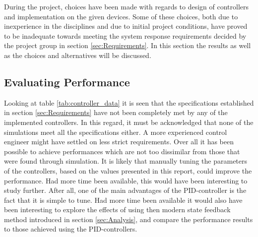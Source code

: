 \documentclass[../../main.tex]{subfiles}
\begin{document}

During the project, choices have been made with regards to design of controllers and implementation on the given devices. Some of these choices, both due to inexperience in the disciplines and due to initial project conditions, have proved to be inadequate towards meeting the system response requirements decided by the project group in section \ref{sec:Requirements}. In this section the results as well as the choices and alternatives will be discussed.

\subsection{Evaluating Performance}

Looking at table \ref{tab:controller_data} it is seen that the specifications established in section \ref{sec:Requirements} have not been completely met by any of the implemented controllers. In this regard, it must be acknowledged that none of the simulations meet all the specifications either. A more experienced control engineer might have settled on less strict requirements.
Over all it has been possible to achieve performances which are not too dissimilar from those that were found through simulation. It is likely that manually tuning the parameters of the controllers, based on the values presented in this report, could improve the performance. Had more time been available, this would have been interesting to study further. After all, one of the main advantages of the PID-controller is the fact that it is simple to tune. Had more time been available it would also have been interesting to explore the effects of using then modern state feedback method introduced in section \ref{sec:Analysis}, and compare the performance results to those achieved using the PID-controllers.
\end{document}
